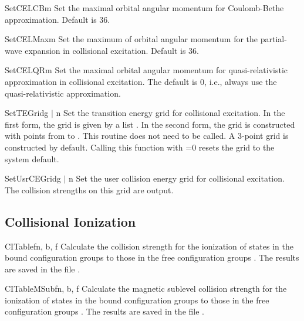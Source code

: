 \begin{fundesc}{SetCELCB}{m}
Set the maximal orbital angular momentum for Coulomb-Bethe approximation.
Default is 36.
\end{fundesc}

\begin{fundesc}{SetCELMax}{m}
Set the maximum of orbital angular momentum for the partial-wave expansion in
collisional excitation. Default is 36.
\end{fundesc}

\begin{fundesc}{SetCELQR}{m}
Set the maximal orbital angular momentum for quasi-relativistic approximation
in collisional excitation. The default is 0, i.e., always use the
quasi-relativistic approximation.
\end{fundesc}

\begin{fundesc}{SetTEGrid}{g $\mid$ n}
Set the transition energy grid for collisional excitation. In the first form,
the grid is given by a list . In the second form, the grid is constructed
with  points from   to . This routine does not need to be
called. A 3-point grid is constructed by default. Calling this function with
=0 resets the grid to the system default.
\end{fundesc}

\begin{fundesc}{SetUsrCEGrid}{g $\mid$ n}
Set the user collision energy grid for collisional excitation. The collision
strengths on this grid are output.
\end{fundesc}



\subsection{Collisional Ionization}

\begin{fundesc}{CITable}{fn, b, f}
Calculate the collision strength for the ionization of states in the bound
configuration groups  to those in the free configuration groups
. The results are saved in the file .
\end{fundesc}

\begin{fundesc}{CITableMSub}{fn, b, f}
Calculate the magnetic sublevel collision strength for the ionization of
states in the bound configuration groups  to those in the free
configuration groups . The results are saved in the file .
\end{fundesc}

